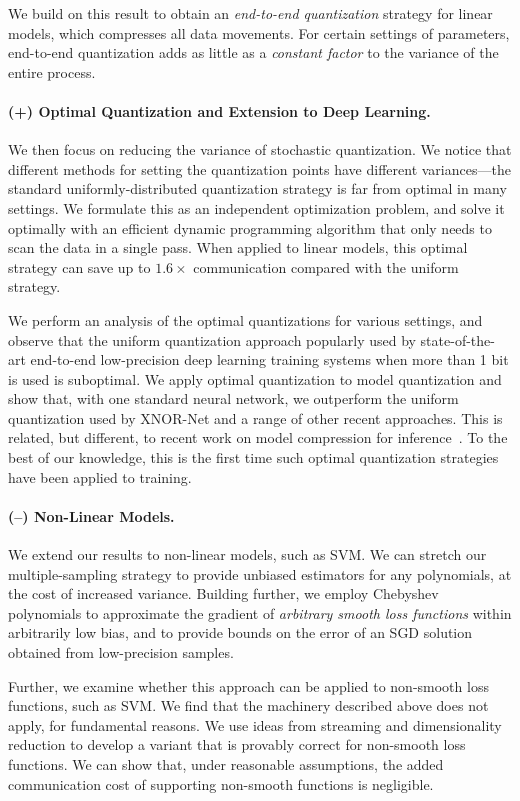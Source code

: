 \documentclass{article}
\begin{document}
We build on this result to obtain an \emph{end-to-end quantization} strategy
for linear models, which compresses all data movements. 
For certain settings of parameters, end-to-end quantization adds as little as a \emph{constant factor} to the variance of the entire process. 

\paragraph{(+) Optimal Quantization and Extension to Deep Learning.}
We then focus on reducing the variance of  
stochastic quantization. We notice that different methods for setting the quantization points have different variances---the standard uniformly-distributed quantization strategy is far from optimal in many settings.
We formulate this as an independent optimization problem, and solve it optimally with 
an efficient dynamic programming algorithm 
that only needs to scan the data in a single pass.
When applied to linear models, this optimal 
strategy can save up to $1.6\times$ communication
compared with the uniform strategy.

We perform an analysis of the optimal quantizations for various settings, and observe that the uniform quantization approach
popularly used by state-of-the-art end-to-end
low-precision deep learning training systems
when more than 1 bit is used is suboptimal.
We apply optimal quantization to 
model quantization and show that, with one
standard neural network, we outperform the
uniform quantization used by XNOR-Net and a
range of other recent approaches. This
is related, but different, to recent work 
on model compression for inference~\cite{Han:2016:ICLR}. 
To the best of our knowledge, this is the first time such optimal quantization strategies have been applied to training. 

\paragraph{(--) Non-Linear Models.} We extend our
results to non-linear models, such as SVM. We can stretch our multiple-sampling strategy to provide 
unbiased estimators for any polynomials, at the cost of increased variance. 
Building further, we employ Chebyshev polynomials to   
approximate the gradient of \emph{arbitrary smooth loss functions} within arbitrarily low bias, 
and to provide bounds on the error of an SGD solution obtained from low-precision samples. 

Further, we examine whether this approach can be applied to non-smooth loss functions, such as SVM. 
We find that the machinery described above does not apply, for fundamental reasons. 
We use ideas from streaming and dimensionality reduction to develop a variant that is provably correct for non-smooth loss functions. 
We can show that, under reasonable assumptions, the added communication cost of supporting non-smooth functions is negligible. 
\end{document}
